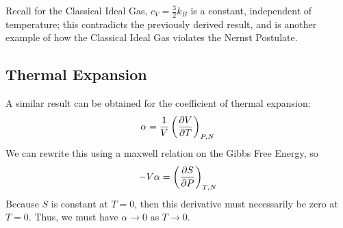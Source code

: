 Recall for the Classical Ideal Gas, \(c_V=\frac{3}{2}k_B\) is a constant, independent of temperature; this contradicts the previously derived result, and is another example of how the Classical Ideal Gas violates the Nernst Postulate.

\subsection{Thermal Expansion}
A similar result can be obtained for the coefficient of thermal expansion:
\[\alpha = \frac{1}{V}\left(\frac{\partial V}{\partial T}\right)_{P,N}\]
We can rewrite this using a maxwell relation on the Gibbs Free Energy, so
\[-V\alpha = \left(\frac{\partial S}{\partial P}\right)_{T,N}\]
Because \(S\) is constant at \(T=0\), then this derivative must necessarily be zero at \(T=0\). Thus, we must have \(\alpha\to0\) as \(T\to 0\).
